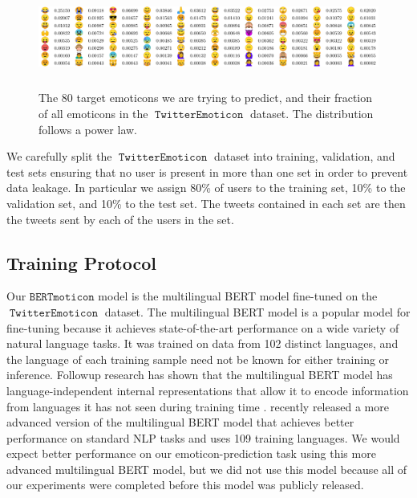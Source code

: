 \documentclass[11pt]{article}
\newcommand{\fixme}[1]{}
\newcommand{\bertmoji}{\texttt{BERTmoticon}}
\DeclareMathOperator{\emoticon}{\texttt{TwitterEmoticon}}
\begin{document}
\begin{figure}
    \centering
    \includegraphics[width = \textwidth,height=1.3in]{images/emoji_table_fix.pdf}
    \caption{
        The 80 target emoticons we are trying to predict,
        and their fraction of all emoticons in the $\emoticon$ dataset.
        The distribution follows a power law.
    } 
    \label{fig:stats:emoticon}
\end{figure}

We carefully split the $\emoticon$ dataset into training, validation, and test sets ensuring that no user is present in more than one set in order to prevent data leakage.
In particular we assign 80\% of users to the training set, 10\% to the validation set, and 10\% to the test set.
The tweets contained in each set are then the tweets sent by each of the users in the set.


\subsection{Training Protocol}

Our $\bertmoji$ model is the multilingual BERT model \citep{devlin2018bert} fine-tuned on the $\emoticon$ dataset.
The multilingual BERT model is a popular model for fine-tuning because it achieves state-of-the-art performance on a wide variety of natural language tasks.
It was trained on data from 102 distinct languages,
and the language of each training sample need not be known for either training or inference.
Followup research has shown that the multilingual BERT model has language-independent internal representations that allow it to encode information from languages it has not seen during training time \citep{pires2019multilingual,wu2019emerging}.
\citet{feng2020language} recently released a more advanced version of the multilingual BERT model that achieves better performance on standard NLP tasks and uses 109 training languages.
We would expect better performance on our emoticon-prediction task using this more advanced multilingual BERT model,
but we did not use this model because all of our experiments were completed before this model was publicly released.
\end{document}
